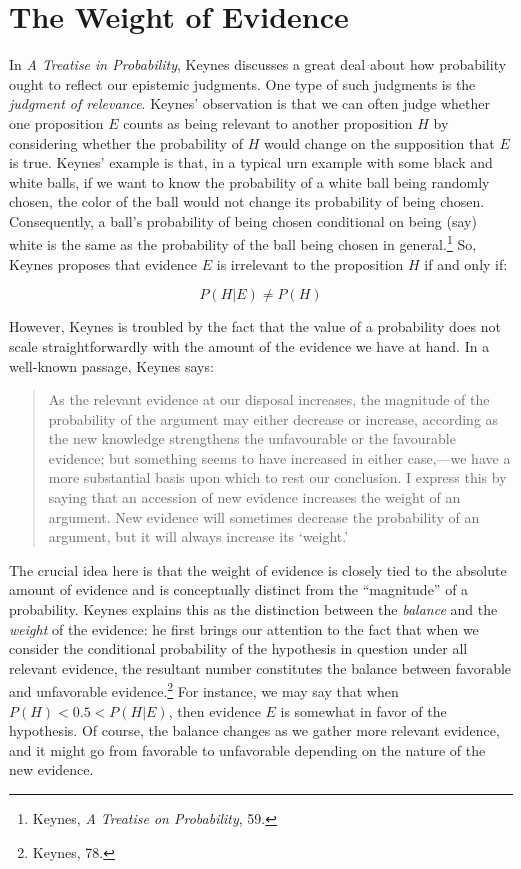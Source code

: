 \hypertarget{the-weight-of-evidence-1}{
\section{The Weight of Evidence}\label{the-weight-of-evidence-1}
}

In \emph{A Treatise in Probability}, Keynes discusses a great deal about
how probability ought to reflect our epistemic judgments. One type of
such judgments is the \emph{judgment of relevance}. Keynes' observation
is that we can often judge whether one proposition \(E\) counts as being
relevant to another proposition \(H\) by considering whether the
probability of \(H\) would change on the supposition that \(E\) is true.
Keynes' example is that, in a typical urn example with some black and
white balls, if we want to know the probability of a white ball being
randomly chosen, the color of the ball would not change its probability
of being chosen. Consequently, a ball's probability of being
chosen conditional on being (say) white is the same as the probability
of the ball being chosen in general.\footnote{Keynes, \emph{A Treatise
  on Probability}, 59.} So, Keynes proposes that evidence \(E\) is
irrelevant to the proposition \(H\) if and only if:

\[P(H|E ) \neq P(H) \]

However, Keynes is troubled by the fact that the
value of a probability does not scale straightforwardly with the amount
of the evidence we have at hand. In a well-known passage, Keynes says:

\begin{quote}
As the relevant evidence at our disposal increases, the magnitude of the
probability of the argument may either decrease or increase, according
as the new knowledge strengthens the unfavourable or the favourable
evidence; but something seems to have increased in either case,---we
have a more substantial basis upon which to rest our conclusion. I
express this by saying that an accession of new evidence increases the
weight of an argument. New evidence will sometimes decrease the
probability of an argument, but it will always increase its `weight.'
\end{quote}

The crucial idea here is that the weight of evidence is closely tied to the
absolute amount of evidence and is conceptually distinct from the
``magnitude'' of a probability. Keynes explains this as the distinction
between the \emph{balance} and the \emph{weight} of the evidence: he
first brings our attention to the fact that when we consider the
conditional probability of the hypothesis in question under all relevant
evidence, the resultant number constitutes the balance between favorable
and unfavorable evidence.\footnote{Keynes, 78.} For instance, we may say
that when \(P(H)<0.5 <P(H|E)\), then evidence \(E\) is somewhat in favor
of the hypothesis. Of course, the balance changes as we gather more
relevant evidence, and it might go from favorable to unfavorable
depending on the nature of the new evidence.

